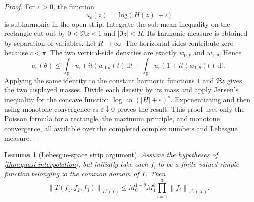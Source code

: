 \documentclass[11pt]{article}
\newtheorem{lemma}[theorem]{Lemma}
\newcommand{\R}{\mathbb{R}}
\newcommand{\dd}{\,\mathrm{d}}
\newcommand{\norm}[2]{\left\lVert #1\right\rVert_{#2}}
\newcommand{\eps}{\varepsilon}
\newcommand{\abs}[1]{\left|#1\right|}
\begin{document}
	\begin{proof}
		For \(\eps>0\), the function
		\[
		u_\eps(z)=\log\bigl(\abs{H(z)}+\eps\bigr)
		\]
		is subharmonic in the open strip.  Integrate the sub-mean inequality on the rectangle cut out by
		\(0<\Re z<1\) and \(\abs{\Im z}<R\).  Its harmonic measure is obtained by separation of variables.  Let \(R\to\infty\).  The horizontal sides contribute zero because \(c<\pi\).  The two vertical-side densities are exactly \(w_{0,\theta}\) and \(w_{1,\theta}\).  Hence
		\[
		u_\eps(\theta)
		\leq
		\int_\R u_\eps(it)w_{0,\theta}(t)\dd t
		+
		\int_\R u_\eps(1+it)w_{1,\theta}(t)\dd t.
		\]
		Applying the same identity to the constant harmonic functions \(1\) and \(\Re z\) gives the two displayed masses.  Divide each density by its mass and apply Jensen's inequality for the concave function \(\log\) to \((\abs{H}+\eps)^s\).  Exponentiating and then using monotone convergence as \(\eps\downarrow0\) proves the result.  This proof uses only the Poisson formula for a rectangle, the maximum principle, and monotone convergence, all available over the completed complex numbers and Lebesgue measure.
	\end{proof}
	
	\begin{lemma}[Lebesgue-space strip argument]\label{lem:lebesgue-strip}
		Assume the hypotheses of \cref{thm:quasi-interpolation}, but initially take each \(f_i\) to be a finite-valued simple function belonging to the common domain of \(T\).  Then
		\[
		\norm{T(f_1,f_2,f_3)}{L^q(Y)}
		\leq
		M_0^{1-\theta}M_1^\theta
		\prod_{i=1}^3\norm{f_i}{L^{p_i}(X)}.
		\]
	\end{lemma}
	
\end{document}
